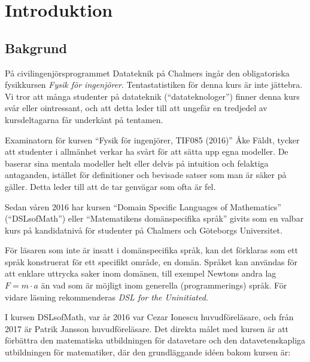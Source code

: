 
\chapter{Introduktion}

\section{Bakgrund}

\begin{draft}

På civilingenjörsprogrammet Datateknik på Chalmers ingår den obligatoriska fysikkursen
\textit{Fysik för ingenjörer}. Tentastatistiken för denna kurs är
inte jättebra\cite{tentastatistik}. Vi
tror att många studenter på datateknik (``datateknologer'') finner denna kurs
svår eller ointressant, och att detta leder till att ungefär en
tredjedel av kursdeltagarna får underkänt på tentamen.

Examinatorn för kursen ``Fysik för ingenjörer, TIF085 (2016)'' Åke Fäldt, tycker
att studenter i allmänhet verkar ha svårt för att sätta upp egna
modeller. De baserar sina mentala modeller helt eller delvis på
intuition och felaktiga antaganden, istället för definitioner och
bevisade satser som man är säker på gäller. Detta leder till att de
tar genvägar som ofta är fel.

Sedan våren 2016 har kursen ``Domain Specific Languages of
Mathematics'' (``DSLsofMath'') eller ``Matematikens domänspecifika språk''
givits som en valbar kurs på kandidatnivå för studenter på Chalmers och
Göteborgs Universitet.

För läsaren som inte är insatt i domänspecifika språk, kan det
förklaras som ett språk konstruerat för ett specifikt område, en
domän. Språket kan användas för att enklare uttrycka saker inom
domänen, till exempel Newtons andra lag $F=m \cdot a$ än vad som är
möjligt inom generella (programmerings) språk. För vidare läsning
rekommenderas \textit{DSL for the Uninitiated}.\cite{DSLU}

I kursen DSLsofMath, var år 2016 var Cezar Ionescu huvudföreläsare, och från 2017
är Patrik Jansson huvudföreläsare. Det direkta målet med kursen är att förbättra den
matematiska utbildningen för datavetare och den datavetenskapliga utbildningen
för matematiker, där den grundläggande idéen bakom kursen är: 


\end{draft}
